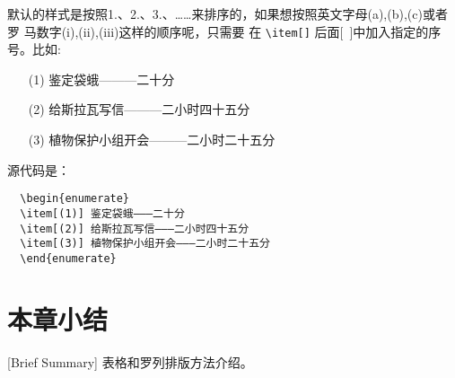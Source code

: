 默认的样式是按照1.、2.、3.、……来排序的，如果想按照英文字母(a),(b),(c)或者罗
马数字(i),(ii),(iii)这样的顺序呢，只需要
在 \verb|\item[]| 后面[~]中加入指定的序号。比如:
\begin{enumerate}
\item[(1)] 鉴定袋蛾———二十分
\item[(2)] 给斯拉瓦写信———二小时四十五分
\item[(3)] 植物保护小组开会———二小时二十五分
\end{enumerate}
源代码是：
\begin{lstlisting}
  \begin{enumerate}
  \item[(1)] 鉴定袋蛾———二十分
  \item[(2)] 给斯拉瓦写信———二小时四十五分
  \item[(3)] 植物保护小组开会———二小时二十五分
  \end{enumerate}
\end{lstlisting}

\section*{本章小结}[Brief Summary]
表格和罗列排版方法介绍。
